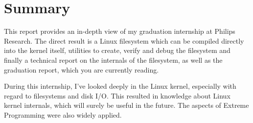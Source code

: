 \chapter{Summary}

This report provides an in-depth view of my graduation internship at Philips Research. The direct result is a Linux filesystem which can be compiled directly into the kernel itself, utilities to create, verify and debug the filesystem and finally a technical report on the internals of the filesystem, as well as the graduation report, which you are currently reading.

During this internship, I've looked deeply in the Linux kernel, especially with regard to filesystems and disk I/O. This resulted in knowledge about Linux kernel internals, which will surely be useful in the future. The aspects of Extreme Programming were also widely applied.
